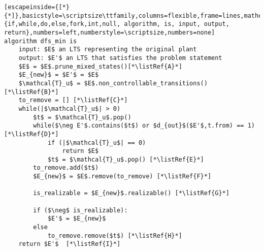 \renewcommand{\ttdefault}{pcr}
\begin{lstlisting}[escapeinside={[*}{*]},basicstyle=\scriptsize\ttfamily,columns=flexible,frame=lines,mathescape=true,keywordstyle=\textbf,morekeywords={if,while,do,else,fork,int,null, algorithm, is, input, output, return},numbers=left,numberstyle=\scriptsize,numbers=none]
algorithm dfs_min is
	input: $E$ an LTS representing the original plant
	output: $E'$ an LTS that satisfies the problem statement
	$E$ = $E$.prune_mixed_states()[*\listRef{A}*]
	$E_{new}$ = $E'$ = $E$ 
	$\mathcal{T}_u$ = $E$.non_controllable_transitions() [*\listRef{B}*]
	to_remove = [] [*\listRef{C}*]
	while(|$\mathcal{T}_u$| > 0)
		$t$ = $\mathcal{T}_u$.pop()
		while($\neg E'$.contains($t$) or $d_{out}$($E'$,t.from) == 1)[*\listRef{D}*]
			if (|$\mathcal{T}_u$| == 0)
				return $E$
			$t$ = $\mathcal{T}_u$.pop() [*\listRef{E}*]		
		to_remove.add($t$)
		$E_{new}$ = $E$.remove(to_remove) [*\listRef{F}*]
		
		is_realizable = $E_{new}$.realizable() [*\listRef{G}*]
		
		if ($\neg$ is_realizable):
			$E'$ = $E_{new}$
		else
			to_remove.remove($t$) [*\listRef{H}*]
	return $E'$  [*\listRef{I}*]
\end{lstlisting}